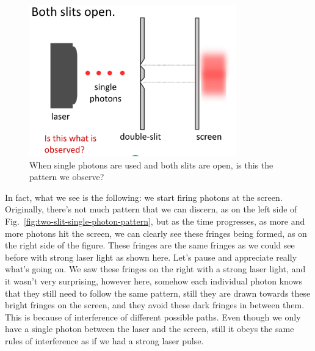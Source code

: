 \begin{figure}[H]
   \centering
    \includegraphics[width=0.8\textwidth]{lesson6/block_neither.pdf}
    
        \caption{When single photons are used and both slits are open, is this the pattern we observe?}
    \label{fig:two-slit-single-photon-wrong}
    
\end{figure}

In fact, what we see is the following: we start firing photons at the screen. Originally, there's not much pattern that we can discern, as on the left side of Fig.~\ref{fig:two-slit-single-photon-pattern}, but as the time progresses, as more and more photons hit the screen, we can clearly see these fringes being formed, as on the right side of the figure. These fringes are the same fringes as we could see before with strong laser light as shown here. Let's pause and appreciate really what's going on. We saw these fringes on the right with a strong laser light, and it wasn't very surprising, however here, somehow each individual photon knows that they still need to follow the same pattern, still they are drawn towards these bright fringes on the screen, and they avoid these dark fringes in between them. This is because of interference of different possible paths. Even though we only have a single photon between the laser and the screen, still it obeys the same rules of interference as if we had a strong laser pulse.


